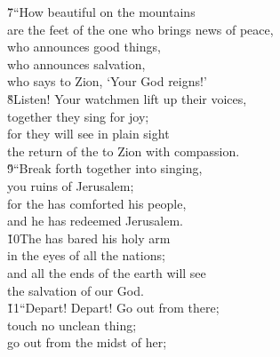 \begin{poetry}
\poeml \v{7}``How beautiful on the mountains \\
\poemll    are the feet of the one who brings news of peace, \\
\poeml who announces good things, \\
\poemll    who announces salvation, \\
\poemlll       who says to Zion, `Your God reigns!' \\
\poeml \v{8}Listen! Your watchmen lift up their voices, \\
\poemll    together they sing for joy; \\
\poeml for they will see in plain sight \\
\poemll    the return of the  to Zion with compassion. \\
\poeml \v{9}``Break forth together into singing, \\
\poemll    you ruins of Jerusalem; \\
\poeml for the  has comforted his people, \\
\poemll    and he has redeemed Jerusalem. \\
\poeml \v{10}The  has bared his holy arm \\
\poemll    in the eyes of all the nations; \\
\poeml and all the ends of the earth will see \\
\poemll    the salvation of our God. \\
\poeml \v{11}``Depart! Depart! Go out from there; \\
\poemll    touch no unclean thing; \\
\poeml go out from the midst of her; \\

\end{poetry}
